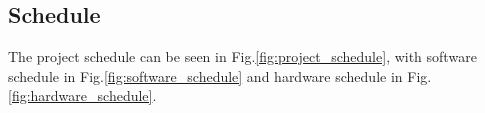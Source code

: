 \subsection{Schedule}

The project schedule can be seen in Fig.\:\ref{fig:project_schedule}, with software schedule in Fig.\:\ref{fig:software_schedule} and hardware schedule in Fig.\:\ref{fig:hardware_schedule}.

